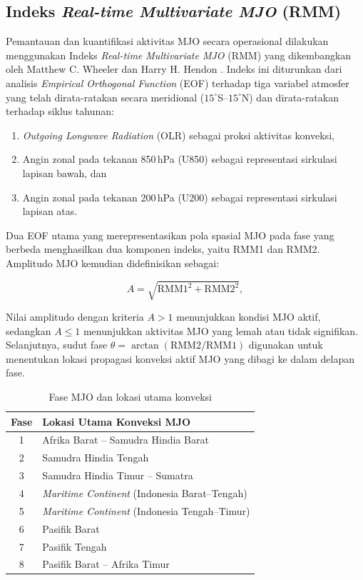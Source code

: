 \documentclass[12pt,a4paper]{report}
\begin{document}
\subsection{Indeks \textit{Real-time Multivariate MJO} (RMM)}
 
Pemantauan dan kuantifikasi aktivitas MJO secara operasional dilakukan menggunakan Indeks \textit{Real-time Multivariate MJO} (RMM) yang dikembangkan oleh Matthew C. Wheeler dan Harry H. Hendon \cite{wheeler2004}. Indeks ini diturunkan dari analisis
\textit{Empirical Orthogonal Function} (EOF) terhadap tiga variabel atmosfer
yang telah dirata-ratakan secara meridional ($15^\circ$S--$15^\circ$N) dan
dirata-ratakan terhadap siklus tahunan:
 
\begin{enumerate}
  \item \textit{Outgoing Longwave Radiation} (OLR) sebagai proksi aktivitas
        konveksi,
  \item Angin zonal pada tekanan 850\,hPa (U850) sebagai representasi
        sirkulasi lapisan bawah, dan
  \item Angin zonal pada tekanan 200\,hPa (U200) sebagai representasi
        sirkulasi lapisan atas.
\end{enumerate}
 
Dua EOF utama yang merepresentasikan pola spasial MJO pada fase yang berbeda menghasilkan dua komponen indeks, yaitu RMM1 dan RMM2. Amplitudo MJO kemudian didefinisikan sebagai:
 
\begin{equation}
  A = \sqrt{\mathrm{RMM1}^2 + \mathrm{RMM2}^2},
  \label{eq:rmm}
\end{equation}
 
\noindent
Nilai amplitudo dengan kriteria $A > 1$ menunjukkan kondisi MJO aktif, sedangkan $A \leq 1$ menunjukkan aktivitas MJO yang lemah atau tidak signifikan. Selanjutnya, sudut fase $\theta = \arctan(\mathrm{RMM2}/\mathrm{RMM1})$ digunakan untuk menentukan lokasi propagasi konveksi aktif MJO yang dibagi ke dalam delapan fase.

\begin{table}[h]
\centering
\caption{Fase MJO dan lokasi utama konveksi}
\label{tab:mjo_phase}
\renewcommand{\arraystretch}{1.4}
\begin{tabular}{cl}
\toprule
\textbf{Fase} & \textbf{Lokasi Utama Konveksi MJO} \\
\midrule
1 & Afrika Barat -- Samudra Hindia Barat \\
2 & Samudra Hindia Tengah \\
3 & Samudra Hindia Timur -- Sumatra \\
4 & \textit{Maritime Continent} (Indonesia Barat--Tengah) \\
5 & \textit{Maritime Continent} (Indonesia Tengah--Timur) \\
6 & Pasifik Barat \\
7 & Pasifik Tengah \\
8 & Pasifik Barat -- Afrika Timur \\
\bottomrule
\end{tabular}
\end{table}
\end{document}
